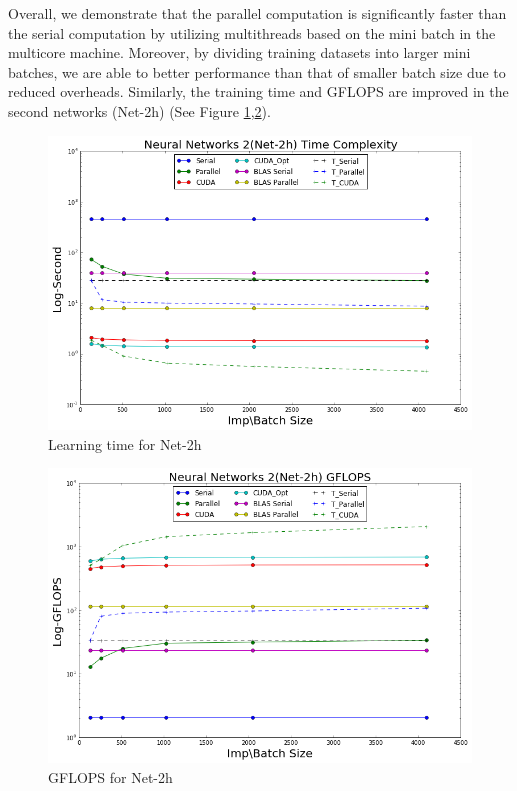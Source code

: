 Overall, we demonstrate that the parallel computation is significantly faster than the serial computation by utilizing multithreads based on the mini batch in the multicore machine. Moreover, by dividing training datasets into larger mini batches, we are able to better performance than that of smaller batch size due to reduced overheads. Similarly, the training time and GFLOPS are improved in the second networks (Net-2h) (See Figure \ref{fig:nn2_time},\ref{fig:nn2_gflops}). 
\begin{figure}[ht]
\begin{center}
\centerline{\includegraphics[width=\columnwidth]{../../slide/nn2_time.png}}
\caption{Learning time for Net-2h}
\label{fig:nn2_time}
\end{center}
\vskip -0.4in
\end{figure}
\begin{figure}[ht]
\vskip 0.2in
\begin{center}
\centerline{\includegraphics[width=\columnwidth]{../../slide/nn2_gflops.png}}
\caption{GFLOPS for Net-2h}
\label{fig:nn2_gflops}
\end{center}
\vskip -0.4in
\end{figure}



